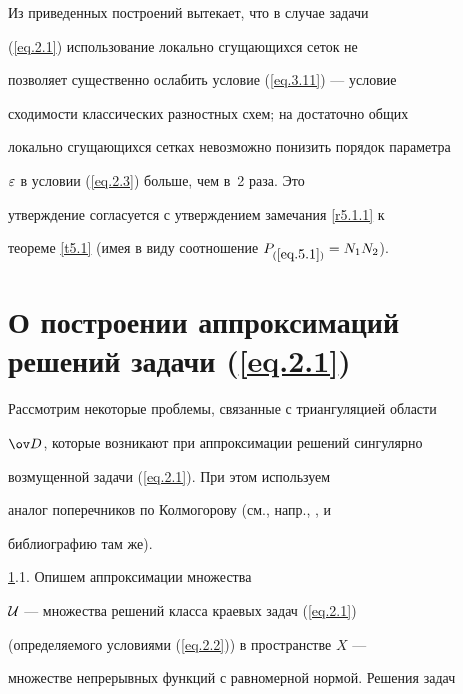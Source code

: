 \begin{notes} \label{r4.1.1}


Из приведенных построений вытекает, что в случае задачи


(\ref{eq.2.1}) использование локально сгущающихся сеток не


позволяет существенно ослабить условие (\ref{eq.3.11}) --- условие


сходимости классических разностных схем; на достаточно общих


локально сгущающихся сетках невозможно понизить порядок параметра


$\varepsilon$ в условии (\ref{eq.2.3}) больше, чем в~2 раза. Это


утверждение согласуется с утверждением замечания \ref{r5.1.1} к


теореме \ref{t5.1} (имея в виду соотношение $P_{(\ref{eq.5.1})}=N_1N_2$).


\end{notes}








\section{О построении аппроксимаций решений задачи (\ref{eq.2.1})}


\label{section.5}





Рассмотрим некоторые проблемы, связанные с триангуляцией области


$\od$, которые возникают при аппроксимации решений сингулярно


возмущенной задачи (\ref{eq.2.1}). При этом используем


аналог поперечников по Колмогорову (см., напр., \cite{9}, \cite{10} и


библиографию там же).


\medskip





\ref{section.5}.1. Опишем аппроксимации множества


$\cal{U}$ --- множества решений класса краевых задач (\ref{eq.2.1})


(определяемого условиями (\ref{eq.2.2})) в пространстве $X$ ---


множестве непрерывных функций с равномерной нормой. Решения задач



